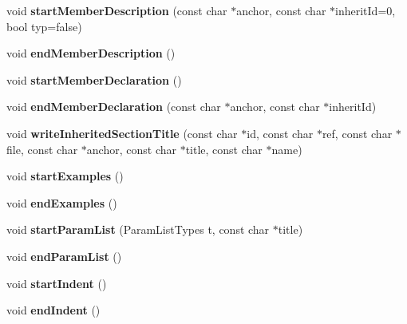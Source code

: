 \begin{DoxyCompactItemize}
void {\bfseries start\+Member\+Description} (const char $\ast$anchor, const char $\ast$inherit\+Id=0, bool typ=false)
\item 
\mbox{\label{class_output_list_a3824b9043050bea2202a29c15b4c5344}} 
void {\bfseries end\+Member\+Description} ()
\item 
\mbox{\label{class_output_list_a09a4062cfac0ed8f9d3dec4cd42f1aa7}} 
void {\bfseries start\+Member\+Declaration} ()
\item 
\mbox{\label{class_output_list_a735dc59d01be196a7f31b2396ff98c76}} 
void {\bfseries end\+Member\+Declaration} (const char $\ast$anchor, const char $\ast$inherit\+Id)
\item 
\mbox{\label{class_output_list_a9fe7e6e7aa48eee2ccdca4e704cff96a}} 
void {\bfseries write\+Inherited\+Section\+Title} (const char $\ast$id, const char $\ast$ref, const char $\ast$file, const char $\ast$anchor, const char $\ast$title, const char $\ast$name)
\item 
\mbox{\label{class_output_list_a6f81a490c1354748afe7e3b834f1907b}} 
void {\bfseries start\+Examples} ()
\item 
\mbox{\label{class_output_list_a5ee61a2f622e01eb1aa47f22faafd3b9}} 
void {\bfseries end\+Examples} ()
\item 
\mbox{\label{class_output_list_ab981978bf338f7ebf63200533a99d305}} 
void {\bfseries start\+Param\+List} (Param\+List\+Types t, const char $\ast$title)
\item 
\mbox{\label{class_output_list_a9f7355d80e1d26ae3c1daec5c156bbfb}} 
void {\bfseries end\+Param\+List} ()
\item 
\mbox{\label{class_output_list_a5805e09c663ccde368463f3c6a767a59}} 
void {\bfseries start\+Indent} ()
\item 
\mbox{\label{class_output_list_a07c0ce4a1d6d962c658f6611e4eeab83}} 
void {\bfseries end\+Indent} ()
\item 

\end{DoxyCompactItemize}
